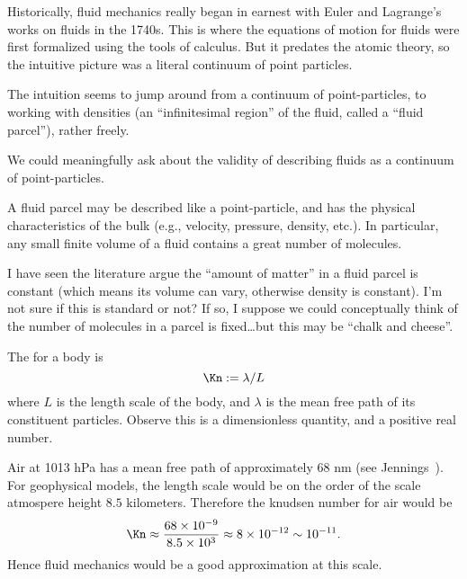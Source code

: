 \begin{node}\label{fluids:describing-0009}%
Historically, fluid mechanics really began in earnest with Euler and
Lagrange's works on fluids in the 1740s. This is where the equations of
motion for fluids were first formalized using the tools of calculus. But
it predates the atomic theory, so the intuitive picture was a literal
continuum of point particles.

The intuition seems to jump around from a continuum of point-particles,
to working with densities (an ``infinitesimal region'' of the fluid,
called a ``fluid parcel''), rather freely.

We could meaningfully ask about the validity of describing fluids as a
continuum of point-particles.

\begin{node}\label{fluids:describing-000A}%
A fluid parcel may be described like a point-particle, and has the
physical characteristics of the bulk (e.g., velocity, pressure, density,
etc.). In particular, any small finite volume of a fluid contains a
great number of molecules.

\begin{node}[Remark]\label{fluids:describing-000B}%
I have seen the literature argue the ``amount of matter'' in a fluid
parcel is constant (which means its volume can vary, otherwise density
is constant). I'm not sure if this is standard or not? If so, I suppose
we could conceptually think of the number of molecules in a parcel is
fixed\dots but this may be ``chalk and cheese''.
\end{node}
\end{node}

\begin{definition}\label{fluids:describing-000C}%
The  for a body is
\begin{equation}
\Kn := \lambda/L
\end{equation}
where $L$ is the length scale of the body, and $\lambda$ is the mean
free path of its constituent particles. Observe this is a dimensionless
quantity, and a positive real number.

\begin{example}\label{fluids:describing-000E}%
Air at 1013 hPa has a mean free path of approximately 68 nm (see
Jennings~\cite{jennings1988air}). For geophysical models, the length
scale would be on the order of the scale atmospere height $8.5$
kilometers. Therefore the knudsen number for air would be
\begin{equation}
\Kn\approx\frac{68\times 10^{-9}}{8.5\times 10^{3}}\approx8\times 10^{-12}\sim10^{-11}.
\end{equation}
Hence fluid mechanics would be a good approximation at this scale.
\end{example}


\end{definition}
\end{node}
